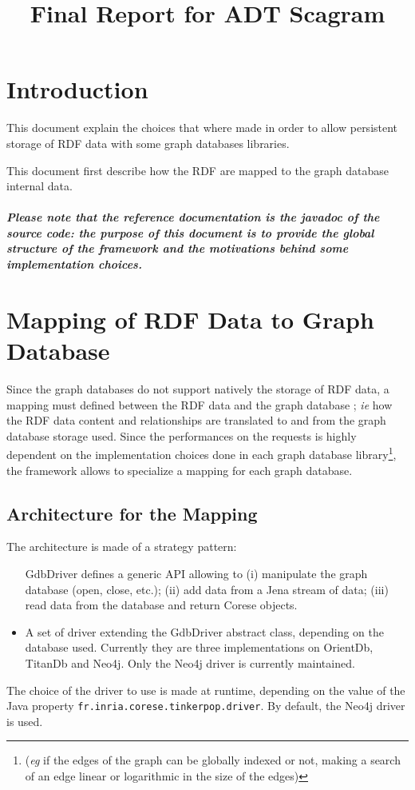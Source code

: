 \documentclass[12pt,a4paper]{memoir} %
\title{Final Report for ADT Scagram}
\author{}
\begin{document}
\maketitle
\tableofcontents* %

\chapter{Introduction}
This document explain the choices that where made in order to allow persistent storage of RDF data with some graph databases libraries.

This document first describe how the RDF are mapped to the graph database internal data.


\paragraph{Please note that the reference documentation is the javadoc of the source code: the purpose of this document is to provide the global structure of the framework and the motivations behind some implementation choices.}

\chapter{Mapping of RDF Data to Graph Database}
Since the graph databases do not support natively the storage of RDF data, a mapping must defined between the RDF data and the graph database ; \textit{ie} how the RDF data content and relationships are translated to and from the graph database storage used.
Since the performances on the requests is highly dependent on the implementation choices done in each graph database library\footnote{(\textit{eg} if the edges of the graph can be globally indexed or not, making a search of an edge linear or logarithmic in the size of the edges)}, the framework allows to specialize a mapping for each graph database.

\section{Architecture for the Mapping}

The architecture is made of a strategy pattern:
\begin{itemize}
\item[GdbDriver] defines a generic API allowing to (i) manipulate the graph database (open, close, etc.); (ii) add data from a Jena stream of data; (iii) read data from the database and return Corese objects.
\item A set of driver extending the GdbDriver abstract class, depending on the database used. Currently they are three implementations on OrientDb, TitanDb and Neo4j. Only the Neo4j driver is currently maintained.
\end{itemize}
The choice of the driver to use is made at runtime, depending on the value of the Java property \texttt{fr.inria.corese.tinkerpop.driver}. By default, the Neo4j driver is used.
\end{document}
